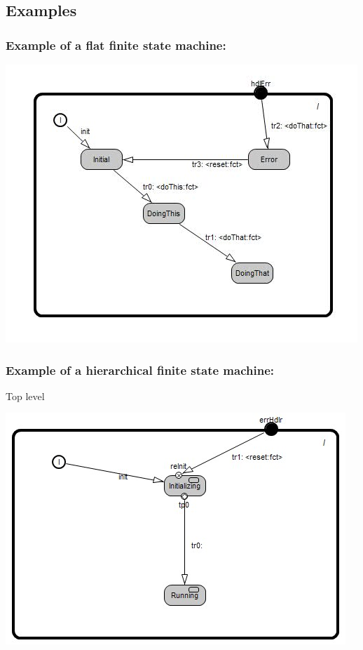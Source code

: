 \subsection{Examples}

\subsubsection{Example of a flat finite state machine:}

\includegraphics[scale=0.7]{images/040-FlatFSM.jpg}

\subsubsection{Example of a hierarchical finite state machine:}

Top level

\includegraphics[scale=0.7]{images/040-HierarchicalFSMTop.jpg}

